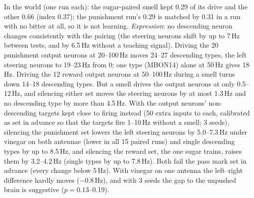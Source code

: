 \begin{enumerate}[leftmargin=*, label=\arabic*., itemsep=4pt]
In the world (one run each): the sugar-paired smell kept 0.29 of its drive and the other 0.66 (index 0.37); the punishment run's 0.29 is matched by 0.31 in a run with no bitter at all, so it is not learning. \emph{Expression}: no descending neuron changes consistently with the pairing (the steering neurons shift by up to 7\,Hz between tests, and by 6.5\,Hz without a teaching signal). Driving the 20 punishment output neurons at 20--100\,Hz moves 24--27 descending types, the left steering neurons to 19--23\,Hz from 0; one type (MBON14) alone at 50\,Hz gives 18\,Hz. Driving the 12 reward output neurons at 50--100\,Hz during a smell turns down 14--18 descending types. But a smell drives the output neurons at only 0.5--12\,Hz, and silencing either set moves the steering neurons by at most 1.3\,Hz and no descending type by more than 4.5\,Hz. With the output neurons' non-descending targets kept close to firing instead (50 extra inputs to each, calibrated as set in advance so that the targets fire 1--10\,Hz without a smell; 3 seeds), silencing the punishment set lowers the left steering neurons by 5.0--7.3\,Hz under vinegar on both antennae (lower in all 15 paired runs) and single descending types by up to 8.5\,Hz, and silencing the reward set, the one sugar trains, raises them by 3.2--4.2\,Hz (single types by up to 7.8\,Hz). Both fail the pass mark set in advance (every change below 5\,Hz). With vinegar on one antenna the left--right difference hardly moves ($-$0.8\,Hz), and with 3 seeds the gap to the unpushed brain is suggestive ($p=0.13$--0.19).


\end{enumerate}
